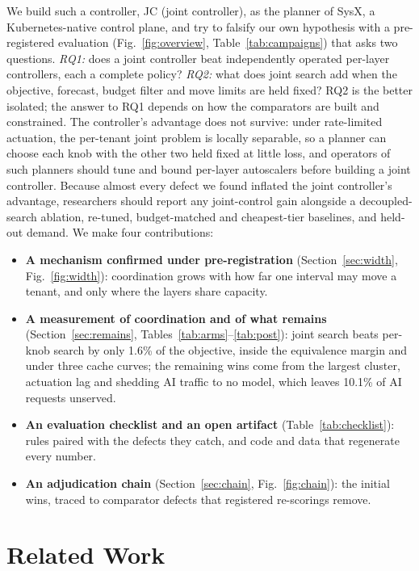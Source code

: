 \documentclass[conference,a4paper]{IEEEtran}
\newcommand{\polyforge}{SysX}
\newcommand{\jcacintro}{JC (joint controller)}
\newcommand{\polyforge}{PolyForge}
\newcommand{\jcacintro}{the Joint Cross-layer Adaptive Controller (JCAC)}
\begin{document}
We build such a controller, \jcacintro{}, as the planner of \polyforge{},
a Kubernetes-native control plane, and try to falsify our own hypothesis
with a pre-registered evaluation (Fig.~\ref{fig:overview},
Table~\ref{tab:campaigns}) that asks two questions. \emph{RQ1:} does a joint
controller beat independently operated per-layer controllers, each a
complete policy? \emph{RQ2:} what does joint search add when the objective,
forecast, budget filter and move limits are held fixed? RQ2 is the better
isolated; the answer to RQ1 depends on how the comparators are built and
constrained. The controller's advantage does not survive: under
rate-limited actuation, the per-tenant joint problem is locally separable,
so a planner can choose each knob with the other two held fixed at little
loss, and operators of such planners should tune and bound per-layer
autoscalers before building a joint controller. Because almost every defect we found inflated the joint
controller's advantage, researchers should report any joint-control gain
alongside a decoupled-search ablation, re-tuned, budget-matched and
cheapest-tier baselines, and held-out demand. We make four contributions:
\begin{itemize}
\item \textbf{A mechanism confirmed under pre-registration}
  (Section~\ref{sec:width}, Fig.~\ref{fig:width}):
  coordination grows with how far one interval may move a tenant, and only
  where the layers share capacity.
\item \textbf{A measurement of coordination and of what remains}
  (Section~\ref{sec:remains}, Tables~\ref{tab:arms}--\ref{tab:post}): joint
  search beats per-knob search by only 1.6\% of the objective, inside the
  equivalence margin and under three cache curves; the remaining wins come
  from the largest cluster, actuation lag and shedding AI traffic to no model,
  which leaves 10.1\% of AI requests unserved.
\item \textbf{An evaluation checklist and an open artifact}
  (Table~\ref{tab:checklist}): rules paired with the defects they catch,
  and code and data that regenerate every number.
\item \textbf{An adjudication chain} (Section~\ref{sec:chain},
  Fig.~\ref{fig:chain}): the initial wins, traced to comparator defects
  that registered re-scorings remove.
\end{itemize}

\section{Related Work}
\label{sec:related}
\end{document}
